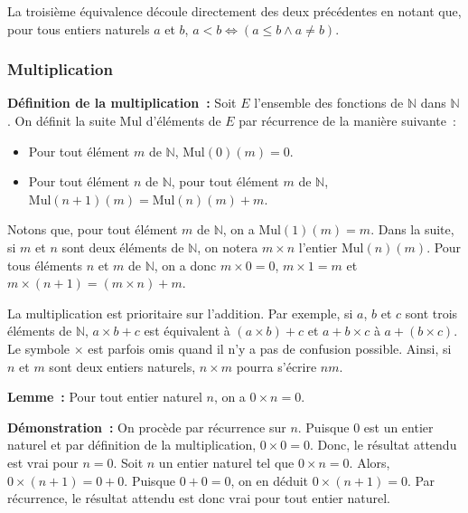     La troisième équivalence découle directement des deux précédentes en notant que, pour tous entiers naturels $a$ et $b$, $a < b \Leftrightarrow (a \leq b \wedge a \neq b)$. 
    
    \done 

\subsubsection{Multiplication}
\label{subsub:multiplication}

\noindent\textbf{Définition de la multiplication :} Soit $E$ l'ensemble des fonctions de $\mathbb{N}$ dans $\mathbb{N}$. 
    On définit la suite $\mathrm{Mul}$ d'éléments de $E$ par récurrence de la manière suivante : 
    \begin{itemize}[nosep]
        \item Pour tout élément $m$ de $\mathbb{N}$, $\mathrm{Mul}(0)(m) = 0$.
        \item Pour tout élément $n$ de $\mathbb{N}$, pour tout élément $m$ de $\mathbb{N}$, $\mathrm{Mul}(n+1)(m) = \mathrm{Mul}(n)(m) + m$.
    \end{itemize}
    Notons que, pour tout élément $m$ de $\mathbb{N}$, on a $\mathrm{Mul}(1)(m) = m$. 
    Dans la suite, si $m$ et $n$ sont deux éléments de $\mathbb{N}$, on notera $m \times n$ l'entier $\mathrm{Mul}(n)(m)$. 
    Pour tous éléments $n$ et $m$ de $\mathbb{N}$, on a donc $m \times 0 = 0$, $m \times 1 = m$ et $m \times (n+1) = (m \times n) + m$.
    
    La multiplication est prioritaire sur l'addition. 
    Par exemple, si $a$, $b$ et $c$ sont trois éléments de $\mathbb{N}$, $a \times b + c$ est équivalent à $(a \times b) + c$ et $a + b \times c$ à $a + (b \times c)$.
    Le symbole $\times$ est parfois omis quand il n'y a pas de confusion possible. 
    Ainsi, si $n$ et $m$ sont deux entiers naturels, $n \times m$ pourra s'écrire $n m$.

\medskip

\noindent\textbf{Lemme :} Pour tout entier naturel $n$, on a $0 \times n = 0$.

\medskip

\noindent\textbf{Démonstration :} On procède par récurrence sur $n$. 
    Puisque $0$ est un entier naturel et par définition de la multiplication, $0 \times 0 = 0$. 
    Donc, le résultat attendu est vrai pour $n = 0$. 
    Soit $n$ un entier naturel tel que $0 \times n = 0$. 
    Alors, $0 \times (n+1) = 0 + 0$.
    Puisque $0 + 0 = 0$, on en déduit $0 \times (n+1) = 0$. 
    Par récurrence, le résultat attendu est donc vrai pour tout entier naturel. 

